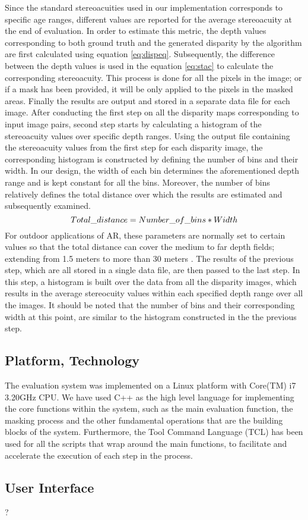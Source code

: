 Since the standard stereoacuities used in our implementation corresponds to specific age ranges, different values are reported for the average stereoacuity
at the end of evaluation. 
In order to estimate this metric, the depth values corresponding to both ground truth and the generated disparity by the algorithm are first
calculated using equation \ref{eq:dispeq}. Subsequently, the difference between the depth values is used in the equation \ref{eq:stac} to calculate
the corresponding stereoacuity. This process is done for all the pixels in the image; or if a mask has been provided, 
it will be only applied to the pixels in the masked areas. Finally the results are output and stored in a separate data file for each image.
After conducting the first step on all the disparity maps corresponding to input image pairs, second step starts by calculating a histogram of
the stereoacuity values over specific depth ranges. Using the output file containing the stereoacuity values 
from the first step for each disparity image, the corresponding histogram is constructed by defining the number of bins and their width.
In our design, the width of each bin determines the aforementioned depth range and is kept constant for all the bins.
Moreover, the number of bins relatively defines the total distance over which the results
are estimated and subsequently examined.
\begin{equation}
\centering
Total\_distance = Number\_of\_bins * Width
\end{equation}
For outdoor applications of AR, these parameters are normally set to certain values so that the total distance can cover the medium to far 
depth fields; extending from 1.5 meters to more than 30 meters \cite{swa07}.
The results of the previous step, which are all stored in a single data file, are then passed to the last step. 
In this step, a histogram is built over the data from all the disparity images, which results in the average stereocuity
values within each specified depth range over all the images. 
It should be noted that the number of bins and their corresponding width at this point, are
similar to the histogram constructed in the the previous step.

\subsection{Platform, Technology}
The evaluation system was implemented on a Linux platform with Core(TM) i7 3.20GHz CPU. 
We have used C++ as the high level language for implementing 
the core functions within the system, such as the main evaluation function, 
the masking process and the other fundamental operations that are the building blocks of the system.
Furthermore, the Tool Command Language (TCL) has been used for all the scripts that wrap around the main functions,
to facilitate and accelerate the execution of each step in the process.

\subsection{User Interface}
?
